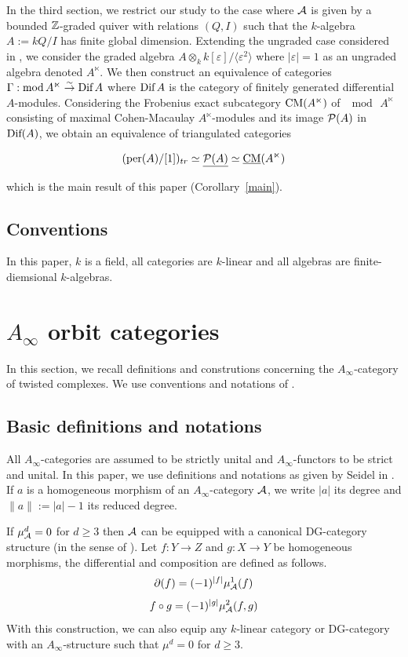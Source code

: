 \documentclass[12pt]{article}
\begin{document}
	In the third section, we restrict our study to the case where ${\cal{A}}$ is given by a bounded $\mathbb{Z}$-graded quiver with relations $(Q,I)$ such that the $k$-algebra $A:=kQ/I$ has finite global dimension. Extending the ungraded case considered in \cite{Win}, we consider the graded algebra $A \otimes_k k[\varepsilon]/\langle \varepsilon^2 \rangle$ where $|\varepsilon| = 1$ as an ungraded algebra denoted $A^\ltimes$. We then construct an equivalence of categories $\Gamma: \textup{mod} \, A^\ltimes \overset{\sim}{\to} \textup{Dif} \, A$ where $\textup{Dif} \, A$ is the category of finitely generated differential $A$-modules. Considering the Frobenius exact subcategory $\textup{CM}(A^\ltimes)$ of $\mod \, A^\ltimes$ consisting of maximal Cohen-Macaulay $A^\ltimes$-modules and its image ${\cal{P}}(A)$ in $\textup{Dif}(A)$, we obtain an equivalence of triangulated categories
	
	\[(\textup{per}(A)/[1])_{tr} \simeq \underline{{\cal{P}}(A)} \simeq {\underbar{\textup{CM}}}(A^\ltimes)\]
	
	\noindent which is the main result of this paper (Corollary~\ref{main}).
	

	\subsection*{Conventions}
	
	In this paper, $k$ is a field, all categories are $k$-linear and all algebras are finite-diemsional $k$-algebras.
	
	\section{$A_\infty$ orbit categories}
	
	In this section, we recall definitions and construtions concerning the $A_\infty$-category of twisted complexes. We use conventions and notations of \cite{Sei}.
	
	\subsection{Basic definitions and notations}
	
	All $A_\infty$-categories are assumed to be strictly unital and $A_\infty$-functors to be strict and unital. In this paper, we use definitions and notations as given by Seidel in \cite{Sei}. If $a$ is a homogeneous morphism of an $A_\infty$-category ${\cal{A}}$, we write $|a|$ its degree and $\| a \|:= |a| - 1$ its reduced degree. 
	
	\begin{remark}
		\label{Ainftystr}
		If $\mu^d_{\cal{A}}=0$ for $d \geq 3$ then ${\cal{A}}$ can be equipped with a canonical DG-category structure (in the sense of \cite{KelDG}). Let $f:Y \to Z$ and $g:X \to Y$ be homogeneous morphisms, the differential and composition are defined as follows.
 		\[\partial(f) = (-1)^{|f|} \mu^1_{\cal{A}}(f)\]
 		\[f \circ g = (-1)^{|g|} \mu^2_{\cal{A}}(f,g)\]
 		With this construction, we can also equip any $k$-linear category or DG-category with an $A_\infty$-structure such that $\mu^d = 0$ for $d \geq 3$.
	\end{remark}
	
\end{document}
